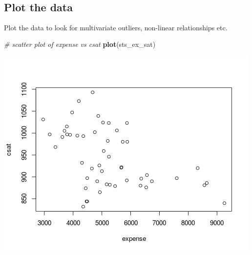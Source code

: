 \documentclass[
]{book}
\newenvironment{Shaded}{\begin{snugshade}}{\end{snugshade}}
\newcommand{\CommentTok}[1]{\textcolor[rgb]{0.56,0.35,0.01}{\textit{#1}}}
\newcommand{\DataTypeTok}[1]{\textcolor[rgb]{0.13,0.29,0.53}{#1}}
\newcommand{\KeywordTok}[1]{\textcolor[rgb]{0.13,0.29,0.53}{\textbf{#1}}}
\newcommand{\NormalTok}[1]{#1}
\newcommand{\OperatorTok}[1]{\textcolor[rgb]{0.81,0.36,0.00}{\textbf{#1}}}
\newcommand{\StringTok}[1]{\textcolor[rgb]{0.31,0.60,0.02}{#1}}
\begin{document}
\begin{Shaded}
\end{Shaded}

\hypertarget{plot-the-data}{%
\subsection{Plot the data}\label{plot-the-data}}

Plot the data to look for multivariate outliers, non-linear relationships etc.

\begin{Shaded}
\begin{Highlighting}[]
  \CommentTok{# scatter plot of expense vs csat}
  \KeywordTok{plot}\NormalTok{(sts_ex_sat)}
\end{Highlighting}
\end{Shaded}

\includegraphics{R/Rmodels/images/statesCorr1.png}
\end{document}
